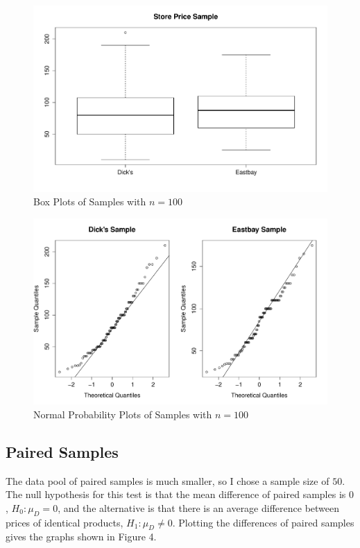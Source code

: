 \documentclass[12pt]{article}
\begin{document}
\begin{figure}[h]
\centering
\includegraphics[width=1.0\textwidth]{samples_boxplot}
\caption{Box Plots of Samples with $n=100$}
\end{figure}

\begin{figure}[h]
\centering
\includegraphics[width=1.0\textwidth]{samples_qq}
\caption{Normal Probability Plots of Samples with $n=100$}
\end{figure}

\clearpage
\subsection{Paired Samples}
The data pool of paired samples is much smaller, so I chose a sample size of $50$. The null hypothesis for this test is that the mean difference of paired samples is $0$, $H_0: \mu_D = 0$, and the alternative is that there is an average difference between prices of identical products, $H_1: \mu_D \neq 0$. Plotting the differences of paired samples gives the graphs shown in Figure 4.
\end{document}
